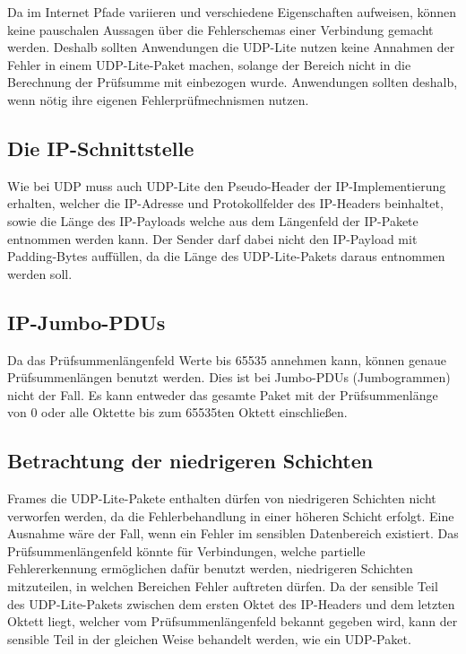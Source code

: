 \documentclass{template}
\begin{document}
Da im Internet Pfade variieren und verschiedene Eigenschaften aufweisen,
können keine pauschalen Aussagen über die Fehlerschemas einer
Verbindung gemacht werden. Deshalb sollten Anwendungen die UDP-Lite
nutzen keine Annahmen der Fehler in einem UDP-Lite-Paket machen,
solange der Bereich nicht in die Berechnung der Prüfsumme
mit einbezogen wurde. Anwendungen sollten deshalb, wenn nötig
ihre eigenen Fehlerprüfmechnismen nutzen.


\subsection{Die IP-Schnittstelle}

Wie bei UDP muss auch UDP-Lite den Pseudo-Header der 
IP-Implementierung erhalten, welcher die IP-Adresse 
und Protokollfelder des IP-Headers beinhaltet, sowie die
Länge des IP-Payloads welche aus dem Längenfeld der IP-Pakete
entnommen werden kann.
Der Sender darf dabei nicht den IP-Payload mit Padding-Bytes
auffüllen, da die Länge des UDP-Lite-Pakets daraus entnommen werden soll.


\subsection{IP-Jumbo-PDUs}

Da das Prüfsummenlängenfeld Werte bis 65535 annehmen kann,
können genaue Prüfsummenlängen benutzt werden. Dies ist bei
Jumbo-PDUs (Jumbogrammen) nicht der Fall. Es kann entweder das
gesamte Paket mit der Prüfsummenlänge von 0 oder alle Oktette bis
zum 65535ten Oktett einschließen.


\subsection{Betrachtung der niedrigeren Schichten}

Frames die UDP-Lite-Pakete enthalten dürfen von niedrigeren
Schichten nicht verworfen werden, da die Fehlerbehandlung in einer
höheren Schicht erfolgt. Eine Ausnahme wäre der Fall, wenn ein
Fehler im sensiblen Datenbereich existiert. Das Prüfsummenlängenfeld
könnte für Verbindungen, welche partielle Fehlererkennung ermöglichen dafür benutzt werden,
niedrigeren Schichten mitzuteilen,
in welchen Bereichen Fehler auftreten dürfen. Da der sensible
Teil des UDP-Lite-Pakets zwischen dem ersten Oktet des IP-Headers
und dem letzten Oktett liegt, welcher vom Prüfsummenlängenfeld
bekannt gegeben wird, kann der sensible Teil in der gleichen Weise
behandelt werden, wie ein UDP-Paket.
\end{document}
